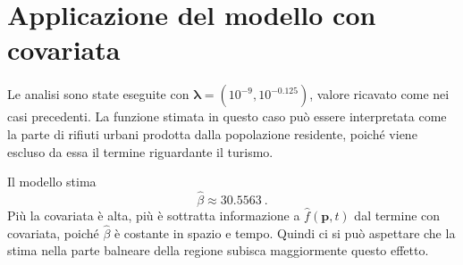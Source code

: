 \documentclass[a4paper,11pt,twoside,openright]{book}							%
\begin{document}
\section{Applicazione del modello con covariata}

Le analisi sono state eseguite con $\bm \lambda = (10^{-9}, 10^{-0.125})$, valore ricavato come nei casi precedenti. La funzione stimata in questo caso può essere interpretata come la parte di rifiuti urbani prodotta dalla popolazione residente, poiché viene escluso da essa il termine riguardante il turismo.

Il modello stima
$$
\hat{\beta}\approx 30.5563 \ .
$$
Più la covariata è alta, più è sottratta informazione a $\hat{f}(\bm p,t)$ dal termine con covariata, poiché $\hat{\beta}$ è costante in spazio e tempo. Quindi ci si può aspettare che la stima nella parte balneare della regione subisca maggiormente questo effetto.
\newpage
\end{document}
